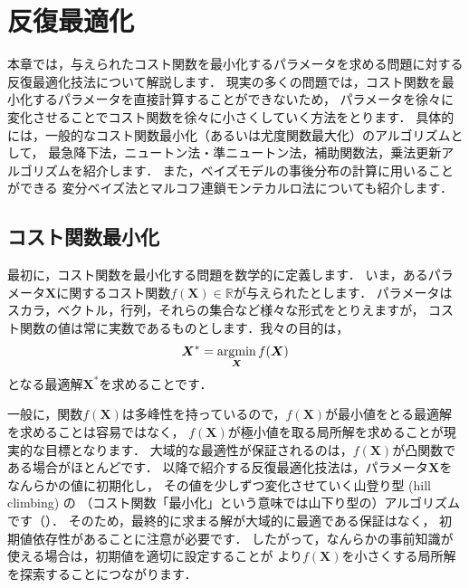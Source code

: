 ﻿\chapter{反復最適化}
\label{cha:optimization}

\begin{leadbox}
本章では，与えられたコスト関数を最小化するパラメータを求める問題に対する
反復最適化技法について解説します．
現実の多くの問題では，コスト関数を最小化するパラメータを直接計算することができないため，
パラメータを徐々に変化させることでコスト関数を徐々に小さくしていく方法をとります．
具体的には，一般的なコスト関数最小化（あるいは尤度関数最大化）のアルゴリズムとして，
最急降下法，ニュートン法・準ニュートン法，補助関数法，乗法更新アルゴリズムを紹介します．
また，ベイズモデルの事後分布の計算に用いることができる
変分ベイズ法とマルコフ連鎖モンテカルロ法についても紹介します．
\end{leadbox}

\section{コスト関数最小化}
\label{sec:cost_function_optimizaition}

最初に，コスト関数を最小化する問題を数学的に定義します．
いま，あるパラメータ$\bm{X}$に関するコスト関数$f(\bm{X}) \in \mathbb{R}$が与えられたとします．
パラメータはスカラ，ベクトル，行列，それらの集合など様々な形式をとりえますが，
コスト関数の値は常に実数であるものとします．我々の目的は，
\begin{align}
 \bm{X}^* = \mathop{\mathrm{argmin}}_{\bm{X}} f(\bm{X})
\end{align}
となる最適解$\bm{X}^*$を求めることです．

一般に，関数$f(\bm{X})$は多峰性を持っているので，$f(\bm{X})$が最小値をとる最適解を求めることは容易ではなく，
$f(\bm{X})$が極小値を取る局所解を求めることが現実的な目標となります．
大域的な最適性が保証されるのは，$f(\bm{X})$が凸関数である場合がほとんどです．
以降で紹介する反復最適化技法は，パラメータ$\bm{X}$をなんらかの値に初期化し，
その値を少しずつ変化させていく山登り型 (hill climbing) の
（コスト関数「最小化」という意味では山下り型の）アルゴリズムです（）．
そのため，最終的に求まる解が大域的に最適である保証はなく，
初期値依存性があることに注意が必要です．
したがって，なんらかの事前知識が使える場合は，初期値を適切に設定することが
より$f(\bm{X})$を小さくする局所解を探索することにつながります．


